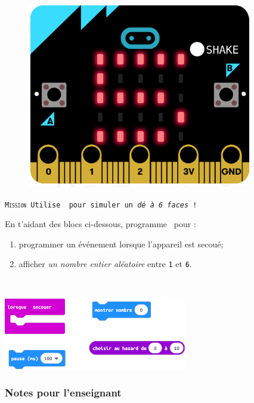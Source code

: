 \begin{figure}
    \includegraphics[width=\linewidth]{res/mbDe6FacesN1.png}
\end{figure}
\begin{eleve}
\texttt{\textsc{Mission} Utilise \mb~pour simuler un \emph{dé à 6 faces} !}

En t'aidant des blocs ci-dessous, programme \mb~pour : 
\begin{enumerate}
    \item programmer un événement lorsque l'appareil est secoué;
    \item afficher \emph{un nombre entier aléatoire} entre \texttt{1} et \texttt{6}.
\end{enumerate}
~\\
\centerline{\includegraphics[width=0.6\textwidth]{res/mbDe6FacesN1blocs.png}}

\end{eleve}


\subsubsection{Notes pour l'enseignant}

